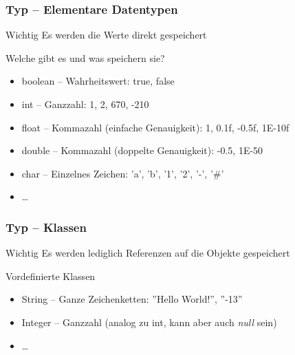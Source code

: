 \documentclass{beamer}
\begin{document}
\begin{frame}
\frametitle{Typ -- Elementare Datentypen}
\begin{block}{Wichtig}
Es werden die Werte direkt gespeichert
\end{block}

\pause

\begin{block}{Welche gibt es und was speichern sie?}
\pause
\begin{itemize}
\item boolean -- Wahrheitswert: true, false\pause\\
\item int -- Ganzzahl: 1, 2, 670, -210\pause\\
\item float -- Kommazahl (einfache Genauigkeit): 1, 0.1f, -0.5f, 1E-10f\pause\\
\item double -- Kommazahl (doppelte Genauigkeit): -0.5, 1E-50\pause\\
\item char -- Einzelnes Zeichen: 'a', 'b', '1', '2', '-', '\#'\\
\item \dots
\end{itemize}
\end{block}
\end{frame}


\begin{frame}
\frametitle{Typ -- Klassen}
\begin{block}{Wichtig}
Es werden lediglich Referenzen auf die Objekte gespeichert
\end{block}

\pause

\begin{block}{Vordefinierte Klassen}
\pause
\begin{itemize}
\item String -- Ganze Zeichenketten: ''Hello World!'', ''-13''\pause\\
\item Integer -- Ganzzahl (analog zu int, kann aber auch \textit{null} sein)\\
\item \dots
\end{itemize}
\end{block}
\end{frame}
\end{document}
